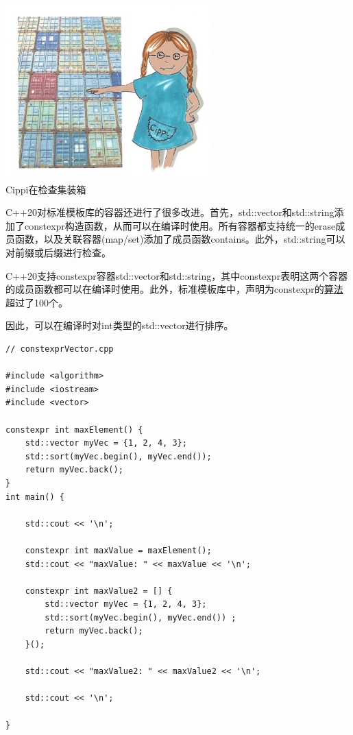 \begin{center}
\includegraphics[width=0.6\textwidth]{content/3/chapter5/images/10.png}\\
Cippi在检查集装箱
\end{center}

C++20对标准模板库的容器还进行了很多改进。首先，std::vector和std::string添加了constexpr构造函数，从而可以在编译时使用。所有容器都支持统一的erase成员函数，以及关联容器(map/set)添加了成员函数contains。此外，std::string可以对前缀或后缀进行检查。


C++20支持constexpr容器std::vector和std::string，其中constexpr表明这两个容器的成员函数都可以在编译时使用。此外，标准模板库中，声明为constexpr的\href{https://en.cppreference.com/w/cpp/algorithm}{算法}超过了100个。

因此，可以在编译时对int类型的std::vector进行排序。

\begin{lstlisting}[style=styleCXX]
// constexprVector.cpp

#include <algorithm>
#include <iostream>
#include <vector>

constexpr int maxElement() {
	std::vector myVec = {1, 2, 4, 3};
	std::sort(myVec.begin(), myVec.end());
	return myVec.back();
}
int main() {

	std::cout << '\n';
	
	constexpr int maxValue = maxElement();
	std::cout << "maxValue: " << maxValue << '\n';
	
	constexpr int maxValue2 = [] {
		std::vector myVec = {1, 2, 4, 3};
		std::sort(myVec.begin(), myVec.end()) ;
		return myVec.back();
	}();
	
	std::cout << "maxValue2: " << maxValue2 << '\n';
	
	std::cout << '\n';

}
\end{lstlisting}

